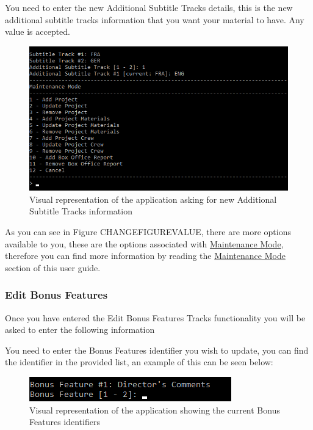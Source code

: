 \documentclass[
  english,
  a4paper,
,tablecaptionabove
]{scrartcl}
\begin{document}
You need to enter the new Additional Subtitle Tracks details, this is
the new additional subtitle tracks information that you want your
material to have. Any value is accepted.

\begin{figure}
\centering
\includegraphics{images/user-guide/maintenance-mode/update-project-material-additional-subtitle-tracks.png}
\caption{Visual representation of the application asking for new
Additional Subtitle Tracks information}
\end{figure}

As you can see in Figure CHANGEFIGUREVALUE, there are more options
available to you, these are the options associated with
\protect\hyperlink{using-maintenance-mode}{Maintenance Mode}, therefore
you can find more information by reading the
\protect\hyperlink{using-maintenance-mode}{Maintenance Mode} section of
this user guide.

\newpage

\hypertarget{edit-bonus-features-1}{%
\subsubsection{Edit Bonus Features}\label{edit-bonus-features-1}}

Once you have entered the Edit Bonus Features Tracks functionality you
will be asked to enter the following information

You need to enter the Bonus Features identifier you wish to update, you
can find the identifier in the provided list, an example of this can be
seen below:

\begin{figure}
\centering
\includegraphics{images/user-guide/maintenance-mode/update-project-material-bonus-feature-select-id.png}
\caption{Visual representation of the application showing the current
Bonus Features identifiers}
\end{figure}
\end{document}
